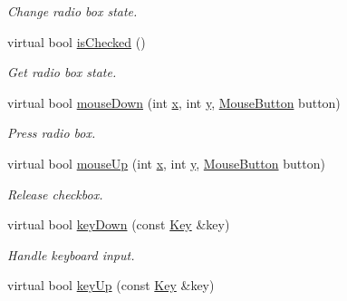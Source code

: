 \begin{DoxyCompactItemize}
\begin{DoxyCompactList}\small\item\em Change radio box state. \end{DoxyCompactList}\item 
\hypertarget{classGUI_1_1Radiobox_aee831b43f8b86aba286af0f190047103}{virtual bool \hyperlink{classGUI_1_1Radiobox_aee831b43f8b86aba286af0f190047103}{is\-Checked} ()}\label{classGUI_1_1Radiobox_aee831b43f8b86aba286af0f190047103}

\begin{DoxyCompactList}\small\item\em Get radio box state. \end{DoxyCompactList}\item 
\hypertarget{classGUI_1_1Radiobox_a0ba2bb717836766e3784db43ebd333f5}{virtual bool \hyperlink{classGUI_1_1Radiobox_a0ba2bb717836766e3784db43ebd333f5}{mouse\-Down} (int \hyperlink{classGUI_1_1Window_a6ca6a80ca00c9e1d8ceea8d3d99a657d}{x}, int \hyperlink{classGUI_1_1Window_a0ee8e923aff2c3661fc2e17656d37adf}{y}, \hyperlink{namespaceGUI_ad06082a7b02aa73697f39eb8e0856de9}{Mouse\-Button} button)}\label{classGUI_1_1Radiobox_a0ba2bb717836766e3784db43ebd333f5}

\begin{DoxyCompactList}\small\item\em Press radio box. \end{DoxyCompactList}\item 
\hypertarget{classGUI_1_1Radiobox_a3fc160611eafdfd4f8467dea4bd27c86}{virtual bool \hyperlink{classGUI_1_1Radiobox_a3fc160611eafdfd4f8467dea4bd27c86}{mouse\-Up} (int \hyperlink{classGUI_1_1Window_a6ca6a80ca00c9e1d8ceea8d3d99a657d}{x}, int \hyperlink{classGUI_1_1Window_a0ee8e923aff2c3661fc2e17656d37adf}{y}, \hyperlink{namespaceGUI_ad06082a7b02aa73697f39eb8e0856de9}{Mouse\-Button} button)}\label{classGUI_1_1Radiobox_a3fc160611eafdfd4f8467dea4bd27c86}

\begin{DoxyCompactList}\small\item\em Release checkbox. \end{DoxyCompactList}\item 
\hypertarget{classGUI_1_1Radiobox_a0fe98fbdab7fd261eabc6ecd877691e1}{virtual bool \hyperlink{classGUI_1_1Radiobox_a0fe98fbdab7fd261eabc6ecd877691e1}{key\-Down} (const \hyperlink{classGUI_1_1Key}{Key} \&key)}\label{classGUI_1_1Radiobox_a0fe98fbdab7fd261eabc6ecd877691e1}

\begin{DoxyCompactList}\small\item\em Handle keyboard input. \end{DoxyCompactList}\item 
\hypertarget{classGUI_1_1Radiobox_a44803d6eed12bba50dbe22153ccdd541}{virtual bool \hyperlink{classGUI_1_1Radiobox_a44803d6eed12bba50dbe22153ccdd541}{key\-Up} (const \hyperlink{classGUI_1_1Key}{Key} \&key)}\label{classGUI_1_1Radiobox_a44803d6eed12bba50dbe22153ccdd541}


\end{DoxyCompactItemize}
